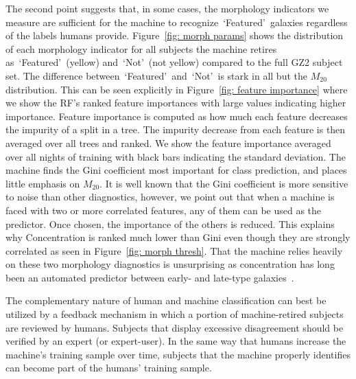 \documentclass[twocolumn]{aastex6}
\newcommand{\M}[1]{$M_{\mathrm{#1}}$}
\newcommand{\feat}{`Featured'}
\newcommand{\notfeat}{`Not'}
\begin{document}
The second point suggests that, in some cases, the morphology indicators we measure are 
sufficient for the machine to recognize~\feat~galaxies regardless of the labels humans provide. 
Figure~\ref{fig: morph params} shows the distribution of each 
morphology indicator for all subjects the machine retires as~\feat~(yellow) 
and~\notfeat~(not yellow) compared to the full GZ2 subject set. 
The difference between~\feat~and~\notfeat~is stark in all but the \M{20} distribution. 
This can be seen explicitly in Figure~\ref{fig:  feature importance} where
we show the RF's ranked feature importances with large values indicating higher importance. 
Feature importance is computed as how much each feature decreases the impurity 
of a split in a tree. The impurity decrease from each feature is then averaged over
all trees and ranked. 
We show the feature importance averaged over all nights of training with 
black bars indicating the standard deviation. The machine finds the Gini coefficient 
most important for class prediction, and places little emphasis on \M{20}. 
It is well known that the Gini coefficient is more sensitive to noise than other diagnostics, 
however, we point out that when a machine is faced with two or more correlated features, 
any of them can be used as the predictor. Once chosen, the importance of the others is reduced. 
This explains why Concentration is ranked much lower than Gini even though they 
are strongly correlated as seen in Figure~\ref{fig: morph thresh}. 
That the machine relies heavily on these two morphology diagnostics is unsurprising as
concentration has long been an automated predictor between early- and late-type galaxies~\citep{Abraham1994, Abraham1996, Shen2003}.


The complementary nature of human and machine classification can 
best be utilized by a feedback mechanism in which a portion of machine-retired
subjects are reviewed by humans. Subjects that display excessive disagreement
should be verified by an expert (or expert-user).  In the same way that 
humans increase the machine's training sample over time, subjects that the
machine properly identifies can become part of the humans' training sample. 



\end{document}
